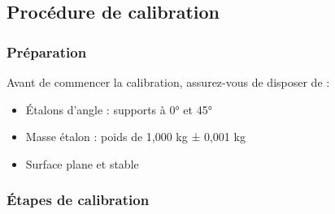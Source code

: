 \documentclass[12pt,a4paper]{article}
\begin{document}
\subsection{Procédure de calibration}

\subsubsection{Préparation}

Avant de commencer la calibration, assurez-vous de disposer de :
\begin{itemize}
    \item Étalons d'angle : supports à 0° et 45°
    \item Masse étalon : poids de 1,000 kg ± 0,001 kg
    \item Surface plane et stable
\end{itemize}

\subsubsection{Étapes de calibration}
\end{document}
